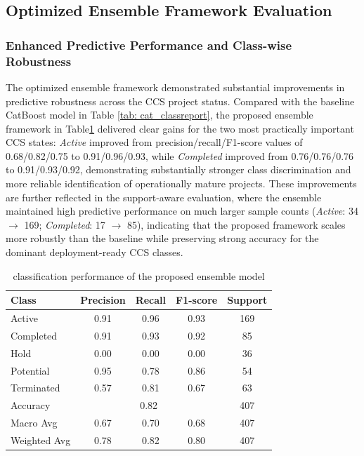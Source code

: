 \documentclass[conference]{IEEEtran}
\begin{document}
\subsection{\textbf{Optimized Ensemble Framework Evaluation}}

\subsubsection{Enhanced Predictive Performance and Class-wise Robustness}

The optimized ensemble framework demonstrated substantial improvements in predictive robustness across the CCS project status. Compared with the baseline CatBoost model in Table \ref{tab: cat_classreport}, the proposed ensemble framework in Table\ref{tab:class_report} delivered clear gains for the two most practically important CCS states: \textit{Active} improved from precision/recall/F1-score values of 0.68/0.82/0.75 to 0.91/0.96/0.93, while \textit{Completed} improved from 0.76/0.76/0.76 to 0.91/0.93/0.92, demonstrating substantially stronger class discrimination and more reliable identification of operationally mature projects. These improvements are further reflected in the support-aware evaluation, where the ensemble maintained high predictive performance on much larger sample counts (\textit{Active}: 34 $\rightarrow$ 169; \textit{Completed}: 17 $\rightarrow$ 85), indicating that the proposed framework scales more robustly than the baseline while preserving strong accuracy for the dominant deployment-ready CCS classes.

\begin{table}[htbp]
\centering
\caption{classification performance of the proposed ensemble model}
\label{tab:class_report}
\begin{tabular}{lcccc}
\hline \toprule
\textbf{Class} & \textbf{Precision} & \textbf{Recall} & \textbf{F1-score} & \textbf{Support} \\
\hline
Active      & 0.91 & 0.96 & 0.93 & 169 \\
Completed   & 0.91 & 0.93 & 0.92 & 85  \\
Hold        & 0.00 & 0.00 & 0.00 & 36  \\
Potential   & 0.95 & 0.78 & 0.86 & 54  \\
Terminated  & 0.57 & 0.81 & 0.67 & 63  \\
\hline
Accuracy    & \multicolumn{3}{c}{0.82} & 407 \\
Macro Avg   & 0.67 & 0.70 & 0.68 & 407 \\
Weighted Avg& 0.78 & 0.82 & 0.80 & 407 \\
\hline \toprule
\end{tabular}
\end{table}
\end{document}
